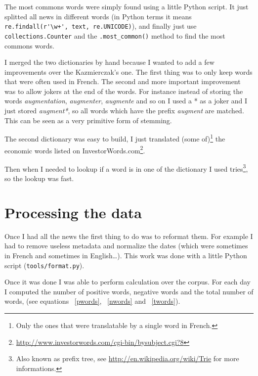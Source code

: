 \documentclass[12pt]{report}
\begin{document}
The most commons words were simply found using a little Python script. It just splitted all news in different words (in Python terms it means \lstinline!re.findall(r'\w+', text, re.UNICODE)!), and finally just use \lstinline!collections.Counter! and the \lstinline!.most_common()! method to find the most commons words.

I merged the two dictionaries by hand because I wanted to add a few improvements over the Kazmierczak's one. The first thing was to only keep words that were often used in French. The second and more important improvement was to allow jokers at the end of the words. For instance instead of storing the words \emph{augmentation}, \emph{augmenter}, \emph{augmente} and so on I used a * as a joker and I just stored \emph{augment*}, so all words which have the prefix \emph{augment} are matched. This can be seen as a very primitive form of stemming.

The second dictionary was easy to build, I just translated (some of)\footnote{Only the ones that were translatable by a single word in French.} the economic words listed on InvestorWords.com\footnote{\url{http://www.investorwords.com/cgi-bin/bysubject.cgi?8}}.

Then when I needed to lookup if a word is in one of the dictionary I used tries\footnote{Also known as prefix tree, see \url{http://en.wikipedia.org/wiki/Trie} for more informations.}, so the lookup was fast.

\section{Processing the data}

Once I had all the news the first thing to do was to reformat them. For example I had to remove useless metadata and normalize the dates (which were sometimes in French and sometimes in English\ldots). This work was done with a little Python script (\lstinline!tools/format.py!).

Once it was done I was able to perform calculation over the corpus. For each day I computed the number of positive words, negative words and the total number of words, (see equations ~\ref{pwords}, ~\ref{nwords} and ~\ref{twords}).
\end{document}

